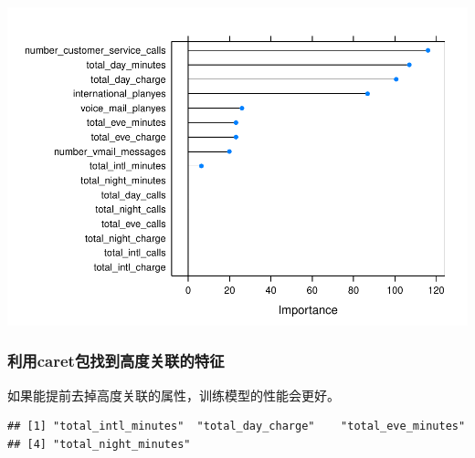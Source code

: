\documentclass[
]{article}
\newenvironment{Shaded}{\begin{snugshade}}{\end{snugshade}}
\newcommand{\CommentTok}[1]{\textcolor[rgb]{0.56,0.35,0.01}{\textit{#1}}}
\newcommand{\DataTypeTok}[1]{\textcolor[rgb]{0.13,0.29,0.53}{#1}}
\newcommand{\FloatTok}[1]{\textcolor[rgb]{0.00,0.00,0.81}{#1}}
\newcommand{\KeywordTok}[1]{\textcolor[rgb]{0.13,0.29,0.53}{\textbf{#1}}}
\newcommand{\NormalTok}[1]{#1}
\newcommand{\OperatorTok}[1]{\textcolor[rgb]{0.81,0.36,0.00}{\textbf{#1}}}
\newcommand{\StringTok}[1]{\textcolor[rgb]{0.31,0.60,0.02}{#1}}
\begin{document}
\includegraphics{R_FinalReport_files/figure-latex/unnamed-chunk-22-1.pdf}

\hypertarget{ux5229ux7528caretux5305ux627eux5230ux9ad8ux5ea6ux5173ux8054ux7684ux7279ux5f81}{%
\subsubsection{利用caret包找到高度关联的特征}\label{ux5229ux7528caretux5305ux627eux5230ux9ad8ux5ea6ux5173ux8054ux7684ux7279ux5f81}}

如果能提前去掉高度关联的属性，训练模型的性能会更好。

\begin{Shaded}
\end{Shaded}

\begin{verbatim}
## [1] "total_intl_minutes"  "total_day_charge"    "total_eve_minutes"  
## [4] "total_night_minutes"
\end{verbatim}
\end{document}
